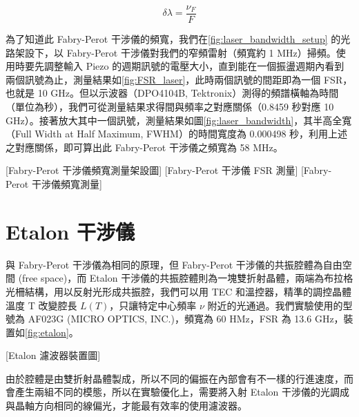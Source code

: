 \documentclass[class=NCU_thesis, crop=false]{standalone}
\begin{document}
\begin{equation}
    \delta \lambda=\frac{\nu_{F}}{F}
    \label{eq:resolution}
\end{equation}

為了知道此 Fabry-Perot 干涉儀的頻寬，我們在\cref{fig:laser_bandwidth_setup} 的光路架設下，以 Fabry-Perot 干涉儀對我們的窄頻雷射（頻寬約 1 MHz）掃頻。使用時要先調整輸入 Piezo 的週期訊號的電壓大小，直到能在一個振盪週期內看到兩個訊號為止，測量結果如\cref{fig:FSR_laser}，此時兩個訊號的間距即為一個 FSR，也就是 10 GHz。但以示波器（DPO4104B, Tektronix）測得的頻譜橫軸為時間（單位為秒），我們可從測量結果求得間與頻率之對應關係（0.8459 秒對應 10 GHz）。接著放大其中一個訊號，測量結果如圖\cref{fig:laser_bandwidth}，其半高全寬（Full Width at Half Maximum, FWHM）的時間寬度為 0.000498 秒，利用上述之對應關係，即可算出此 Fabry-Perot 干涉儀之頻寬為 58 MHz。

[Fabry-Perot 干涉儀頻寬測量架設圖]
[Fabry-Perot 干涉儀 FSR 測量]
[Fabry-Perot 干涉儀頻寬測量]

\section{Etalon 干涉儀}
與 Fabry-Perot 干涉儀為相同的原理，但 Fabry-Perot 干涉儀的共振腔體為自由空間 (free space)，而 Etalon 干涉儀的共振腔體則為一塊雙折射晶體，兩端為布拉格光柵結構，用以反射光形成共振腔，我們可以用 TEC 和溫控器，精準的調控晶體溫度 T 改變腔長 $L(T)$，只讓特定中心頻率 $\nu$ 附近的光通過。我們實驗使用的型號為 AF023G (MICRO OPTICS, INC.)，頻寬為 60 HMz，FSR 為 13.6 GHz，裝置如\cref{fig:etalon}。

[Etalon 濾波器裝置圖]

由於腔體是由雙折射晶體製成，所以不同的偏振在內部會有不一樣的行進速度，而會產生兩組不同的模態，所以在實驗優化上，需要將入射 Etalon 干涉儀的光調成與晶軸方向相同的線偏光，才能最有效率的使用濾波器。
\end{document}
